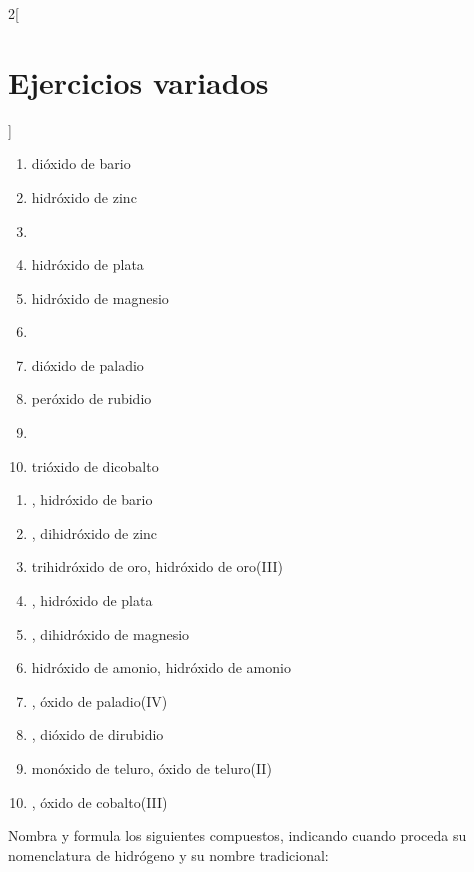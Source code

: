 \documentclass[10pt]{article}
\begin{document}
\begin{multicols*}{2}[
  \section{Ejercicios variados}
  ]
\begin{exercise}[
    tags    = {inorgánica,compuestos binarios,óxidos,peróxidos,hidróxidos},
    topics  = {química inorgánica,formulación,nomenclatura},
    source  = {SAN Formulación, p27, e33},
  ]
  \begin{enumerate}
    \item dióxido de bario
    \item hidróxido de zinc
    \item {}
    \item hidróxido de plata
    \item hidróxido de magnesio
    \item {}
    \item dióxido de paladio
    \item peróxido de rubidio
    \item {}
    \item trióxido de dicobalto
  \end{enumerate}
\end{exercise}

\begin{solution}
  \begin{enumerate}
    \item {}, hidróxido de bario
    \item {}, dihidróxido de zinc
    \item trihidróxido de oro, hidróxido de oro(III)
    \item {}, hidróxido de plata
    \item {}, dihidróxido de magnesio
    \item hidróxido de amonio, hidróxido de amonio
    \item {}, óxido de paladio(IV)
    \item {}, dióxido de dirubidio
    \item monóxido de teluro, óxido de teluro(II)
    \item {}, óxido de cobalto(III)
  \end{enumerate}
\end{solution}




\begin{exercise}[
    tags    = {inorgánica,ácidos,ácidos binarios,ácidos ternarios,oxoácidos},
    topics  = {química inorgánica,formulación,nomenclatura},
    source  = {SAN Formulación, p28, e34},
  ]
  Nombra y formula los siguientes compuestos, indicando cuando proceda su nomenclatura de hidrógeno y su nombre tradicional:


\end{exercise}
\end{multicols*}
\end{document}
